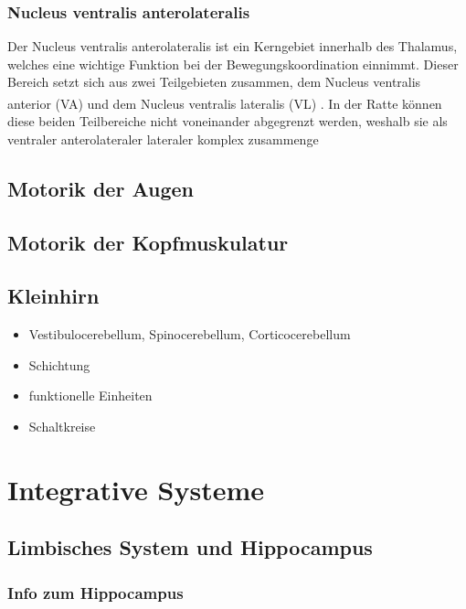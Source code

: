 \documentclass[12pt,a4paper,pdftex]{article}
\begin{document}
\subsubsection{Nucleus ventralis anterolateralis} 
Der Nucleus ventralis anterolateralis ist ein Kerngebiet innerhalb des Thalamus, welches eine wichtige Funktion bei der Bewegungskoordination einnimmt. Dieser Bereich setzt sich aus zwei Teilgebieten zusammen, dem Nucleus ventralis anterior (VA) und dem Nucleus ventralis lateralis (VL) \textsuperscript{\cite[8]{trepel2011neuroanatomie}}. In der Ratte können diese beiden Teilbereiche nicht voneinander abgegrenzt werden, weshalb sie als ventraler anterolateraler lateraler komplex zusammenge   

\subsection{Motorik der Augen}

\subsection{Motorik der Kopfmuskulatur}



\subsection{Kleinhirn}
\begin{itemize}
    \item Vestibulocerebellum, Spinocerebellum, Corticocerebellum 
    \item Schichtung
    \item funktionelle Einheiten
    \item Schaltkreise
\end{itemize}


\newpage
\section{Integrative Systeme}
\subsection{Limbisches System und Hippocampus}

\subsubsection*{Info zum Hippocampus}
\end{document}
